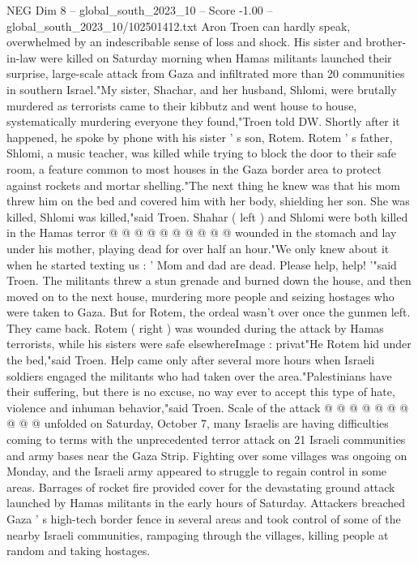 \begin{textsample}{NEG Dim 8 – global\_south\_2023\_10 – Score -1.00 – global\_south\_2023\_10/102501412.txt}  \label{ex:f8_neg_093}
Aron Troen can hardly speak, overwhelmed by an indescribable sense of loss and shock.
His sister and brother-in-law were killed on Saturday morning when Hamas militants launched their surprise, large-scale attack from Gaza and infiltrated more than 20 communities in southern Israel."My sister, Shachar, and her husband, Shlomi, were brutally murdered as terrorists came to their kibbutz and went house to house, systematically murdering everyone they found,"Troen told DW.
Shortly after it happened, he spoke by phone with his sister ' s son, Rotem.
Rotem ' s father, Shlomi, a music teacher, was killed while trying to block the door to their safe room, a feature common to most houses in the Gaza border area to protect against rockets and mortar shelling."The next thing he knew was that his mom threw him on the bed and covered him with her body, shielding her son.
She was killed, Shlomi was killed,"said Troen.
Shahar ( left ) and Shlomi were both killed in the Hamas terror @ @ @ @ @ @ @ @ @ @ wounded in the stomach and lay under his mother, playing dead for over half an hour."We only knew about it when he started texting us : ' Mom and dad are dead.
Please help, help! '"said Troen.
The militants threw a stun grenade and burned down the house, and then moved on to the next house, murdering more people and seizing hostages who were taken to Gaza.
But for Rotem, the ordeal wasn't over once the gunmen left.
They came back.
Rotem ( right ) was wounded during the attack by Hamas terrorists, while his sisters were safe elsewhereImage : privat"He Rotem hid under the bed,"said Troen.
Help came only after several more hours when Israeli soldiers engaged the militants who had taken over the area."Palestinians have their suffering, but there is no excuse, no way ever to accept this type of hate, violence and inhuman behavior,"said Troen.
Scale of the attack @ @ @ @ @ @ @ @ @ @ unfolded on Saturday, October 7, many Israelis are having difficulties coming to terms with the unprecedented terror attack on 21 Israeli communities and army bases near the Gaza Strip.
Fighting over some villages was ongoing on Monday, and the Israeli army appeared to struggle to regain control in some areas.
Barrages of rocket fire provided cover for the devastating ground attack launched by Hamas militants in the early hours of Saturday.
Attackers breached Gaza ' s high-tech border fence in several areas and took control of some of the nearby Israeli communities, rampaging through the villages, killing people at random and taking hostages.

\end{textsample}

